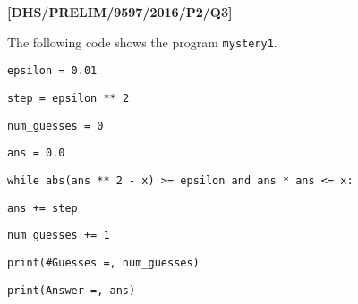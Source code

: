 \item \textbf{{[}DHS/PRELIM/9597/2016/P2/Q3{]}}

The following code shows the program \texttt{mystery1}. 

\noindent %
\noindent\begin{minipage}[t]{1\columnwidth}%
\texttt{epsilon = 0.01 }

\texttt{step = epsilon {*}{*} 2}

\texttt{num\_guesses = 0}

\texttt{ans = 0.0 }

\texttt{while abs(ans {*}{*} 2 - x) >= epsilon and ans {*} ans <=
x: }

\texttt{\qquad{}ans += step }

\texttt{\qquad{}num\_guesses += 1 }

\texttt{print(\textquotedbl\#Guesses =\textquotedbl , num\_guesses) }

\texttt{print(\textquotedbl Answer =\textquotedbl , ans) }%
\end{minipage}
